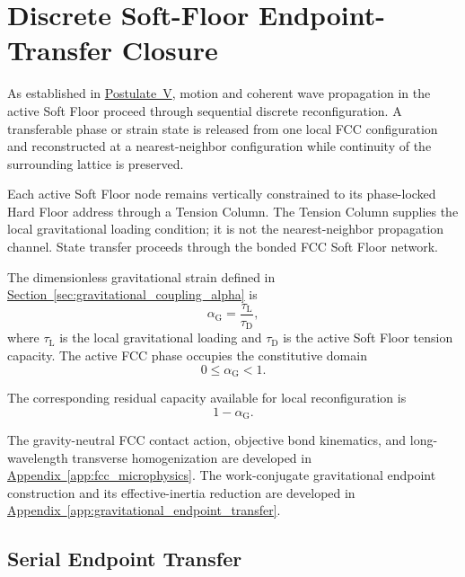 \section{Discrete Soft-Floor Endpoint-Transfer Closure}
\label{sec:discrete_state_transfer}

As established in \hyperref[postulate:five]{Postulate~V}, motion and coherent wave propagation in the active Soft Floor proceed through sequential discrete reconfiguration. A transferable phase or strain state is released from one local FCC configuration and reconstructed at a nearest-neighbor configuration while continuity of the surrounding lattice is preserved.

Each active Soft Floor node remains vertically constrained to its phase-locked Hard Floor address through a Tension Column. The Tension Column supplies the local gravitational loading condition; it is not the nearest-neighbor propagation channel. State transfer proceeds through the bonded FCC Soft Floor network.

The dimensionless gravitational strain defined in \hyperref[sec:gravitational_coupling_alpha]{Section~\ref*{sec:gravitational_coupling_alpha}} is
\begin{equation}
    \alpha_{\mathrm{G}} = \frac{\tau_{\mathrm{L}}}{\tau_{\mathrm{D}}},
\end{equation}
where $\tau_{\mathrm{L}}$ is the local gravitational loading and $\tau_{\mathrm{D}}$ is the active Soft Floor tension capacity. The active FCC phase occupies the constitutive domain
\begin{equation}
    0 \leq \alpha_{\mathrm{G}} < 1.
\end{equation}

The corresponding residual capacity available for local reconfiguration is
\begin{equation}
    1-\alpha_{\mathrm{G}}.
\end{equation}

The gravity-neutral FCC contact action, objective bond kinematics, and long-wavelength transverse homogenization are developed in \hyperref[app:fcc_microphysics]{Appendix~\ref*{app:fcc_microphysics}}. The work-conjugate gravitational endpoint construction and its effective-inertia reduction are developed in \hyperref[app:gravitational_endpoint_transfer]{Appendix~\ref*{app:gravitational_endpoint_transfer}}.

\subsection{Serial Endpoint Transfer}

